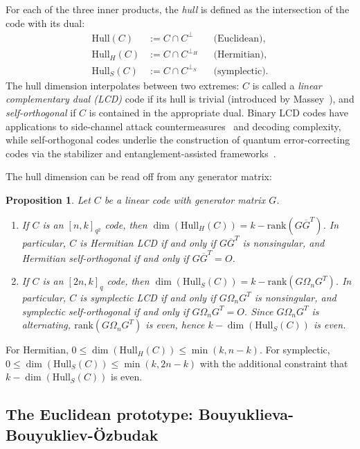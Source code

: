 \documentclass[11pt]{article}
\theoremstyle{plain}
\newtheorem{proposition}[theorem]{Proposition}
\theoremstyle{remark}
\newcommand{\HHull}{\mathrm{Hull}_H}
\begin{document}
For each of the three inner products, the \emph{hull} is defined as the intersection of the code
with its dual:
\begin{align*}
  \mathrm{Hull}(C) &:= C \cap C^\perp & &\text{(Euclidean),}\\
  \HHull(C) &:= C \cap C^{\perp_H} & &\text{(Hermitian),}\\
  \mathrm{Hull}_S(C) &:= C \cap C^{\perp_S} & &\text{(symplectic).}
\end{align*}
The hull dimension interpolates between two extremes: $C$ is called a
\emph{linear complementary dual (LCD)} code if its hull is trivial
(introduced by Massey~\cite{Massey1992}), and \emph{self-orthogonal} if $C$
is contained in the appropriate dual.
Binary LCD codes have applications to side-channel attack countermeasures~\cite{CarletGuilley2016}
and decoding complexity, while self-orthogonal codes underlie the construction of
quantum error-correcting codes via the stabilizer and entanglement-assisted frameworks~\cite{KKKS2006,Dcc-EAqecc}.

The hull dimension can be read off from any generator matrix:
\begin{proposition}\label{prop:hull-dim}
Let $C$ be a linear code with generator matrix $G$.
\begin{enumerate}
\item \cite[Proposition 3.2]{Dcc-EAqecc} If $C$ is an $[n, k]_{q^2}$ code, then
$\dim(\HHull(C)) = k - \mathrm{rank}(G \overline{G}^T)$.
In particular, $C$ is Hermitian LCD if and only if $G \overline{G}^T$ is nonsingular,
and Hermitian self-orthogonal if and only if $G \overline{G}^T = O$.
\item If $C$ is an $[2n, k]_q$ code, then
$\dim(\mathrm{Hull}_S(C)) = k - \mathrm{rank}(G \Omega_n G^T)$.
In particular, $C$ is symplectic LCD if and only if $G \Omega_n G^T$ is nonsingular,
and symplectic self-orthogonal if and only if $G \Omega_n G^T = O$. Since $G \Omega_n G^T$
is alternating, $\mathrm{rank}(G \Omega_n G^T)$ is even, hence
$k - \dim(\mathrm{Hull}_S(C))$ is even.
\end{enumerate}
\end{proposition}
For Hermitian, $0 \leq \dim(\HHull(C)) \leq \min(k, n-k)$.
For symplectic, $0 \leq \dim(\mathrm{Hull}_S(C)) \leq \min(k, 2n-k)$ with the
additional constraint that $k - \dim(\mathrm{Hull}_S(C))$ is even.

\subsection{The Euclidean prototype: Bouyuklieva-Bouyukliev-\"Ozbudak}\label{sec:prelim-bbo}
\end{document}
